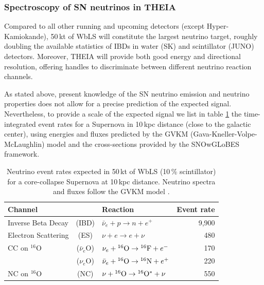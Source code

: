 \subsubsection{Spectroscopy of SN neutrinos in THEIA}

Compared to all other running and upcoming detectors (except Hyper-Kamiokande), 50\,kt of WbLS will constitute the largest neutrino target, roughly doubling the available statistics of IBDs in water (SK) and scintillator (JUNO) detectors. Moreover, THEIA will provide both good energy and directional resolution, offering handles to discriminate between different neutrino reaction channels.

As stated above, present knowledge of the SN neutrino emission and neutrino properties does not allow for a precise prediction of the expected signal. Nevertheless, to provide a scale of the expected signal we list in table \ref{tab:snrates} the time-integrated event rates for a Supernova in 10\,kpc distance (close to the galactic center), using energies and fluxes predicted by the GVKM (Gava-Kneller-Volpe-McLaughlin) model \cite{Gava:2009pj} and the cross-sections provided by the SNOwGLoBES framework.

\begin{table}[h!]
\centering
\begin{tabular}{lclr}
\hline
Channel & & Reaction & Event rate \\
\hline
Inverse Beta Decay & (IBD) & $\bar\nu_e+p\to n+e^+$ & 9,900 \\
 Electron Scattering & (ES) &$\nu+e \to e+\nu$ & 480 \\
 CC on $^{16}$O & ($\bar\nu_e$O) & $\nu_e+ {^{16}{\rm O}} \to  {^{16}{\rm F}}+e^-$ & 170 \\
 & ($\nu_e$O) & $\bar\nu_e+ {^{16}{\rm O}} \to  {^{16}{\rm N}}+e^+$ & 220 \\
NC on $^{16}$O & (NC) &  $\nu + {^{16}{\rm O}} \to  {^{16}{\rm O}^*}+\nu$ & 550 \\
\hline
\end{tabular}
\caption{Neutrino event rates expected in 50\,kt of WbLS (10\,\% scintillator) for a core-collapse Supernova at 10\,kpc distance. Neutrino spectra and fluxes follow the GVKM model \cite{Gava:2009pj}.}
\label{tab:snrates}
\end{table}

